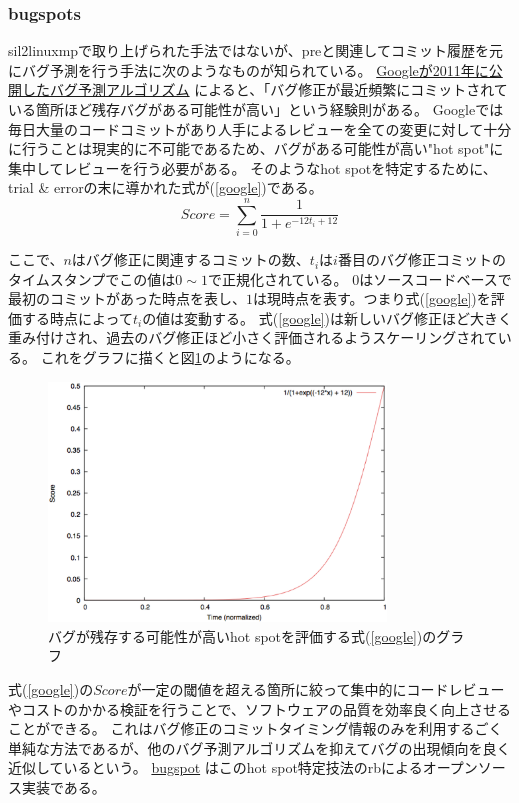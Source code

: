\subsubsection{bugspots}
\acrshort{sil2linuxmp}で取り上げられた手法ではないが、\acrshort{pre}と関連してコミット履歴を元にバグ予測を行う手法に次のようなものが知られている。
\href{http://google-engtools.blogspot.sg/2011/12/bug-prediction-at-google.html}{Googleが2011年に公開したバグ予測アルゴリズム} \cite{google}によると、「バグ修正が最近頻繁にコミットされている箇所ほど残存バグがある可能性が高い」という経験則がある。
Googleでは毎日大量のコードコミットがあり人手によるレビューを全ての変更に対して十分に行うことは現実的に不可能であるため、バグがある可能性が高い"hot spot"に集中してレビューを行う必要がある。
そのようなhot spotを特定するために、trial \& errorの末に導かれた式が(\ref{google})である。
\begin{equation}
  Score = \sum_{i = 0}^{n} \frac{1}{1 + e^{-12t_{i} + 12}}
\label{google}
\end{equation}
\par
ここで、$n$はバグ修正に関連するコミットの数、$t_i$は$i$番目のバグ修正コミットのタイムスタンプでこの値は$0 \sim 1$で正規化されている。
$0$はソースコードベースで最初のコミットがあった時点を表し、$1$は現時点を表す。つまり式(\ref{google})を評価する時点によって$t_i$の値は変動する。
式(\ref{google})は新しいバグ修正ほど大きく重み付けされ、過去のバグ修正ほど小さく評価されるようスケーリングされている。
これをグラフに描くと図\ref{hotspot}のようになる。
\begin{figure}[ht]
  \centering
  \includegraphics[width=0.8\textwidth]{pic/hotspot.eps}
  \caption{バグが残存する可能性が高いhot spotを評価する式(\ref{google})のグラフ}
  \label{hotspot}
\end{figure}
\par
式(\ref{google})の$Score$が一定の閾値を超える箇所に絞って集中的にコードレビューやコストのかかる検証を行うことで、ソフトウェアの品質を効率良く向上させることができる。
これはバグ修正のコミットタイミング情報のみを利用するごく単純な方法であるが、他のバグ予測アルゴリズムを抑えてバグの出現傾向を良く近似しているという。
\href{https://github.com/igrigorik/bugspots}{\acrshort{bugspot}} \cite{bugspot}はこのhot spot特定技法の\acrshort{rb}によるオープンソース実装である。
\newpage
